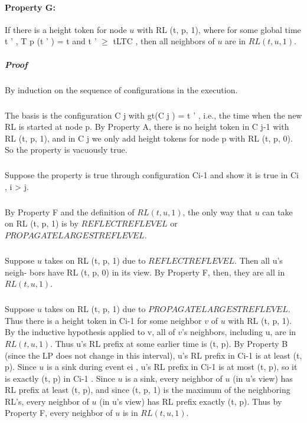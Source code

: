 \paragraph{Property G:} If there is a height token for node $u$ with RL (t, p, 1), where for some global time t ' , T p (t ' ) = t and t ' $\geq$ tLTC , then all neighbors of $u$ are in $RL (t, u, 1)$.
\subparagraph{Proof} By induction on the sequence of configurations in the execution.
\subparagraph{}The basis is the configuration C j with gt(C j ) = t ' , i.e., the time when the new RL is started at node p. By Property A, there is no height token in C j-1 with RL (t, p, 1), and in C j we only add height tokens for node p with RL (t, p, 0). So the property is vacuously true.
\subparagraph{}Suppose the property is true through configuration Ci-1 and show it is true in Ci , i > j.
\subparagraph{}By Property F and the definition of $RL (t, u, 1)$, the only way that $u$ can take on RL (t, p, 1) is by $REFLECTREFLEVEL$ or $PROPAGATELARGESTREFLEVEL$.
\subparagraph{}Suppose $u$ takes on RL (t, p, 1) due to $REFLECTREFLEVEL$. Then all u's neigh- bors have RL (t, p, 0) in its view. By Property F, then, they are all in $RL (t, u, 1)$.
\subparagraph{}Suppose $u$ takes on RL (t, p, 1) due to $PROPAGATELARGESTREFLEVEL$. Thus there is a height token in Ci-1 for some neighbor $v$ of $u$ with RL (t, p, 1). By the inductive hypothesis applied to v, all of $v$'s neighbors, including u, are in $RL (t, u, 1)$. Thus u's RL prefix at some earlier time is (t, p). By Property B (since the LP does not change in this interval), u's RL prefix in Ci-1 is at least (t, p). Since $u$ is a sink during event ei , u's RL prefix in Ci-1 is at most (t, p), so it is exactly (t, p) in Ci-1 . Since $u$ is a sink, every neighbor of $u$ (in u's view) has RL prefix at least (t, p), and since (t, p, 1) is the maximum of the neighboring RL's, every neighbor of $u$ (in u's view) has RL prefix exactly (t, p). Thus by Property F, every neighbor of $u$ is in $RL (t, u, 1)$.
